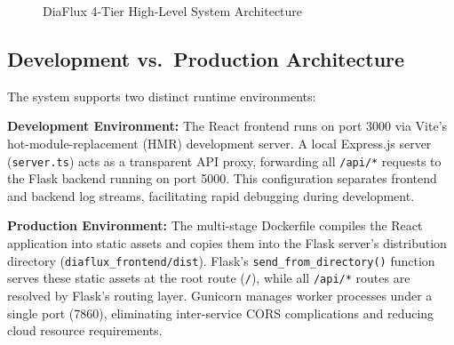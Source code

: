 \documentclass[12pt,a4paper]{report}
\begin{document}
\begin{figure}[H]
\centering
{}
\caption{DiaFlux 4-Tier High-Level System Architecture}
\label{fig:layered_arch}
\end{figure}

\subsection{Development vs.\ Production Architecture}
The system supports two distinct runtime environments:

\textbf{Development Environment:} The React frontend runs on port 3000 via Vite's hot-module-replacement (HMR) development server. A local Express.js server (\texttt{server.ts}) acts as a transparent API proxy, forwarding all \texttt{/api/*} requests to the Flask backend running on port 5000. This configuration separates frontend and backend log streams, facilitating rapid debugging during development.

\textbf{Production Environment:} The multi-stage Dockerfile compiles the React application into static assets and copies them into the Flask server's distribution directory (\texttt{diaflux\_frontend/dist}). Flask's \texttt{send\_from\_directory()} function serves these static assets at the root route (\texttt{/}), while all \texttt{/api/*} routes are resolved by Flask's routing layer. Gunicorn manages worker processes under a single port (7860), eliminating inter-service CORS complications and reducing cloud resource requirements.
\end{document}
